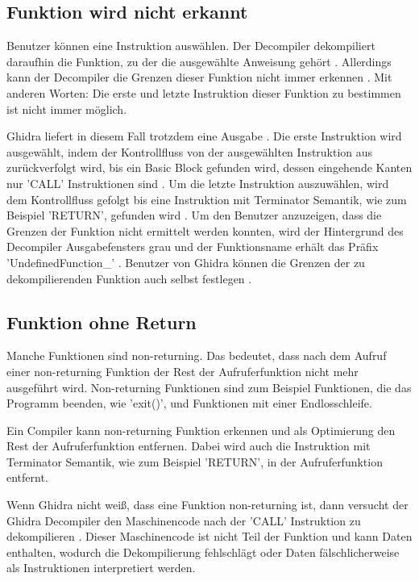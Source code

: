 \subsection{Funktion wird nicht erkannt}

Benutzer können eine Instruktion auswählen. Der Decompiler dekompiliert daraufhin die Funktion, zu der die ausgewählte Anweisung gehört \cite{13}. Allerdings kann der Decompiler die Grenzen dieser Funktion nicht immer erkennen \cite{1}. Mit anderen Worten: Die erste und letzte Instruktion dieser Funktion zu bestimmen ist nicht immer möglich.

Ghidra liefert in diesem Fall trotzdem eine Ausgabe \cite{1}. Die erste Instruktion wird ausgewählt, indem der Kontrollfluss von der ausgewählten Instruktion aus zurückverfolgt wird, bis ein Basic Block gefunden wird, dessen eingehende Kanten nur 'CALL' Instruktionen sind \cite{13}. Um die letzte Instruktion auszuwählen, wird dem Kontrollfluss gefolgt bis eine Instruktion mit Terminator Semantik, wie zum Beispiel 'RETURN', gefunden wird \cite{13}. Um den Benutzer anzuzeigen, dass die Grenzen der Funktion nicht ermittelt werden konnten, wird der Hintergrund des Decompiler Ausgabefensters grau und der Funktionsname erhält das Präfix 'UndefinedFunction\_' \cite{13}. Benutzer von Ghidra können die Grenzen der zu dekompilierenden Funktion auch selbst festlegen \cite{1}.


\subsection{Funktion ohne Return}

Manche Funktionen sind non-returning. Das bedeutet, dass nach dem Aufruf einer non-returning Funktion der Rest der Aufruferfunktion nicht mehr ausgeführt wird. Non-returning Funktionen sind zum Beispiel Funktionen, die das Programm beenden, wie 'exit()', und Funktionen mit einer Endlosschleife.

Ein Compiler kann non-returning Funktion erkennen und als Optimierung den Rest der Aufruferfunktion entfernen. Dabei wird auch die Instruktion mit Terminator Semantik, wie zum Beispiel 'RETURN', in der Aufruferfunktion entfernt.

Wenn Ghidra nicht weiß, dass eine Funktion non-returning ist, dann versucht der Ghidra Decompiler den Maschinencode nach der 'CALL' Instruktion zu dekompilieren \cite{15}. Dieser Maschinencode ist nicht Teil der Funktion und kann Daten enthalten, wodurch die Dekompilierung fehlschlägt oder Daten fälschlicherweise als Instruktionen interpretiert werden.

